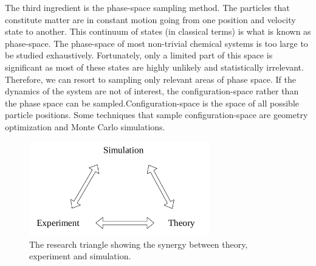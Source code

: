 The third ingredient is the phase-space sampling method. The particles that constitute matter 
are 
in constant motion going from one position and velocity state to another. This continuum of 
states (in classical terms) is what is known as phase-space. The phase-space of most non-trivial 
chemical systems is too large to be studied exhaustively. Fortunately, only a limited part of 
this space is significant as most of these states are highly unlikely and statistically 
irrelevant. Therefore, we can resort to sampling only relevant areas of phase space. If the 
dynamics of the system are not of interest, the configuration-space rather than the phase space can 
be sampled.\newline Configuration-space is the space of all possible particle positions. Some 
techniques 
that sample configuration-space are geometry optimization and Monte Carlo simulations.

\begin{figure}
\centering
         \includegraphics[width=0.7\textwidth]{images/ResearchTriangle.png}
        \caption[Research Triangle]{The research 
triangle showing the synergy between theory, experiment and simulation.}
        \label{fig:1}
\end{figure}

